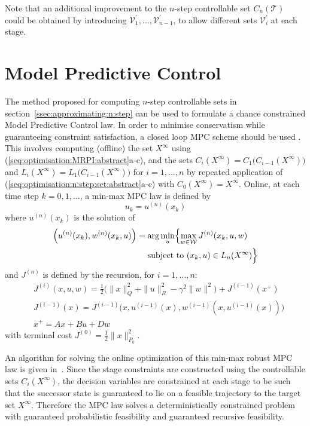 \documentclass{ifacconf}
\providecommand{\W}{\mathcal W}
\providecommand{\V}{\mathcal V}
\providecommand{\T}{\mathcal T}
\begin{document}
Note that an additional improvement to the $n$-step controllable set $C_n(\T)$ could be obtained by introducing $\V_1^\prime,\dots,\V_{n-1}^\prime$, to allow different sets $\V_i^\prime$ at each stage.

\section{Model Predictive Control}\label{ssec:mpc}

The method proposed for computing $n$-step controllable sets in section~\ref{ssec:approximating:n:step} can be used to formulate a chance constrained Model Predictive Control law. In order to minimise conservatism while guaranteeing constraint satisfaction, a closed loop MPC scheme should be used \citep[see e.g.][]{Lee:1997}.
This involves computing (offline) the set $X^\infty$ using \mbox{(\ref{seq:optimisation:MRPI:abstract}a-c)}, and the 
sets $C_{i}(X^\infty) = C_1\bigl(C_{i-1}(X^\infty)\bigr)$ and $L_{i}(X^\infty) = L_1\bigl(C_{i-1}(X^\infty)\bigr)$ 
for $i=1,\ldots,n$ by repeated application of (\ref{seq:optimisation:n:step:set:abstract}a-c) with $C_0(X^\infty)= X^\infty$.
Online, at each time step $k=0,1,\ldots$, a min-max MPC law is defined by 
\[
u_k = u^{(n)}(x_k)
\]
where $u^{(n)}(x_k)$ is the solution of
%
\[%
\begin{aligned}
\Bigl( u^{(n)} (x_k) , w^{(n)} (x_k,u) \Bigr) &= \arg \min_{u} \Bigl\{ \max_{w\in\W} J^{(n)}(x_k,u,w)  
\\
&\ \quad \text{subject to}\ (x_k, u) \in L_n(X^\infty)
\Bigr\}
\end{aligned}
\]%
and $J^{(n)}$ is defined by the recursion, for $i=1,\ldots,n$:
\begin{align*}
&J^{(i)}(x,u,w) = \tfrac{1}{2}\bigl( \| x \|^2_Q + \| u \|^2_R -
\gamma^2 \| w \|^2\bigr) + J^{(i-1)}(x^+) 
\\
&J^{(i-1)}(x) = J^{(i-1)}\bigl(x,u^{(i-1)}(x),w^{(i-1)}(x,u^{(i-1)}(x))\bigr) \\
&x^+ = Ax + Bu + Dw
\end{align*}
with terminal cost $J^{(0)} = \frac{1}{2}\|x\|_{P_0}^2$.

An algorithm for solving the online optimization of this min-max robust MPC law is given in~\citet{Buerger2016}. 
%
Since the stage constraints are constructed using the controllable sets $C_{i}(X^\infty)$, the decision variables are constrained at each stage to be such that the successor state is guaranteed to lie on a feasible trajectory to the target set $X^\infty$. Therefore the MPC law solves a deterministically constrained problem with guaranteed probabilistic feasibility and guaranteed recursive feasibility.
\end{document}
